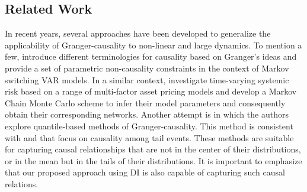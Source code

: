 
\subsection{Related Work}
In recent years, several approaches have been developed to generalize the applicability of Granger-causality to non-linear and large dynamics. 
To mention a few, \citet{psaradakis2005markov} introduce different terminologies for causality based on Granger’s ideas and provide a set of parametric non-causality constraints in the context of Markov switching VAR models.
In a similar context, \citet{bianchi2019modeling} investigate time-varying systemic risk based on a range of multi-factor asset pricing models and develop a Markov Chain Monte Carlo scheme to infer their model parameters and consequently obtain their corresponding networks.
Another attempt is \citet{bonaccolto2019estimation} in which the authors explore quantile-based methods of Granger-causality.
This method is consistent with \citet{hong2009granger} and \citet{corsi2018measuring} that focus on causality among tail events. 
These methods are suitable for capturing causal relationships that are not in the center of their distributions, or in the mean but in the tails of their distributions.
It is important to emphasize that our proposed approach using DI is also capable of capturing such causal relations. 

